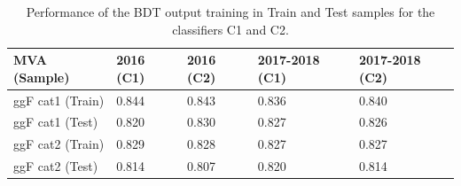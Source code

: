\begin{table}[ht!]
\caption[Performance of the BDT output training in Train and Test samples for the classifiers C1 and C2]{\label{discriminant:tab:ggfmvarocauc_c1c2}Performance of the BDT output training in Train and Test samples for the classifiers C1 and C2.}
\centering
\begin{tabularx}{\textwidth}{lXXXX}
  \hline
   MVA (Sample)                 & 2016 (C1)     & 2016 (C2) & 2017-2018 (C1)     & 2017-2018 (C2)   \\
  \hline
  ggF cat1 (Train)              &   0.844       &  0.843    &   0.836            &   0.840          \\
  ggF cat1 (Test)               &   0.820       &  0.830    &   0.827            &   0.826          \\
  ggF cat2 (Train)              &   0.829       &  0.828    &   0.827            &   0.827          \\
  ggF cat2 (Test)               &   0.814       &  0.807    &   0.820            &   0.814          \\
  \hline
\end{tabularx}
\end{table} 

